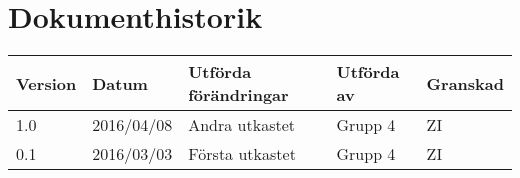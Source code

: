 \documentclass[11pt]{article}
\begin{document}
\tableofcontents

\pagebreak
\section*{Dokumenthistorik}
\begin{table}[h]
\begin{tabular}{|l|l|l|l|l|} \hline

\textbf{Version} & \textbf{Datum} & \textbf{Utförda förändringar} & \textbf{Utförda av} & \textbf{Granskad} \\ \hline
1.0 & 2016/04/08 & Andra utkastet & Grupp 4 & ZI \\ \hline
0.1 & 2016/03/03 & Första utkastet & Grupp 4 & ZI \\ \hline

\end{tabular}
\end{table}

\pagebreak
{}
\end{document}
